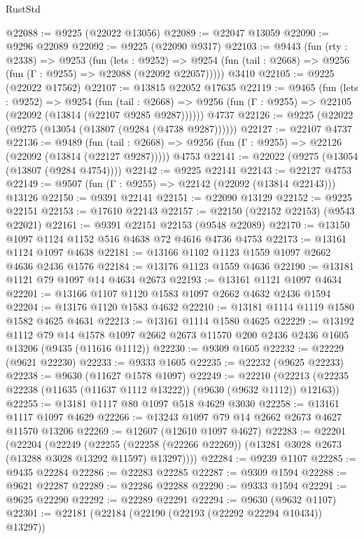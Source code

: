 \begin{lexlean}{RustStd}
\begin{coremodule}
@22088 := @9225 (@22022 @13056)
@22089 := @22047 @13059
@22090 := @9296 @22089
@22092 := @9225 (@22090 @9317)
@22103 := @9443
    (fun (rty : @2338) =>
    @9253
      (fun (lets : @9252) =>
      @9254 (fun (tail : @2668) => @9256 (fun (Γ : @9255) => @22088 (@22092 @22057)))))
    @3410
@22105 := @9225 (@22022 @17562)
@22107 := @13815 @22052 @17635
@22119 := @9465
    (fun (lets : @9252) =>
    @9254
      (fun (tail : @2668) =>
      @9256 (fun (Γ : @9255) => @22105 (@22092 (@13814 (@22107 @9285 @9287))))))
    @4737
@22126 := @9225 (@22022 (@9275 (@13054 (@13807 (@9284 (@4738 @9287))))))
@22127 := @22107 @4737
@22136 := @9489
    (fun (tail : @2668) => @9256 (fun (Γ : @9255) => @22126 (@22092 (@13814 (@22127 @9287)))))
    @4753
@22141 := @22022 (@9275 (@13054 (@13807 (@9284 @4754))))
@22142 := @9225 @22141
@22143 := @22127 @4753
@22149 := @9507 (fun (Γ : @9255) => @22142 (@22092 (@13814 @22143))) @13126
@22150 := @9391 @22141
@22151 := @22090 @13129
@22152 := @9225 @22151
@22153 := @17610 @22143
@22157 := @22150 (@22152 @22153) (@9543 @22021)
@22161 := @9391 @22151 @22153 (@9548 @22089)
@22170 := @13150 @1097 @1124 @1152 @516 @4638 @72 @4616 @4736 @4753
@22173 := @13161 @1124 @1097 @4638
@22181 := @13166 @1102 @1123 @1559 @1097 @2662 @4636 @2436 @1576
@22184 := @13176 @1123 @1559 @4636
@22190 := @13181 @1121 @79 @1097 @14 @4634 @2673
@22193 := @13161 @1121 @1097 @4634
@22201 := @13166 @1107 @1120 @1583 @1097 @2662 @4632 @2436 @1594
@22204 := @13176 @1120 @1583 @4632
@22210 := @13181 @1114 @1119 @1580 @1582 @4625 @4631
@22213 := @13161 @1114 @1580 @4625
@22229 := @13192
    @1112
    @79
    @14
    @1578
    @1097
    @2662
    @2673
    @11570
    @200
    @2436
    @2436
    @1605
    @13206
    (@9435 (@11616 @1112))
@22230 := @9309 @1605
@22232 := @22229 (@9621 @22230)
@22233 := @9333 @1605
@22235 := @22232 (@9625 @22233)
@22238 := @9630 (@11627 @1578 @1097)
@22249 := @22210
    (@22213 (@22235 @22238 (@11635 (@11637 @1112 @13222)) (@9630 (@9632 @1112)) @12163))
@22255 := @13181 @1117 @80 @1097 @518 @4629 @3030
@22258 := @13161 @1117 @1097 @4629
@22266 := @13243 @1097 @79 @14 @2662 @2673 @4627 @11570 @13206
@22269 := @12607 (@12610 @1097 @4627)
@22283 := @22201
    (@22204
      (@22249
        (@22255 (@22258 (@22266 @22269)) (@13281 @3028 @2673 (@13288 @3028 @13292 @11597) @13297))))
@22284 := @9239 @1107
@22285 := @9435 @22284
@22286 := @22283 @22285
@22287 := @9309 @1594
@22288 := @9621 @22287
@22289 := @22286 @22288
@22290 := @9333 @1594
@22291 := @9625 @22290
@22292 := @22289 @22291
@22294 := @9630 (@9632 @1107)
@22301 := @22181 (@22184 (@22190 (@22193 (@22292 @22294 @10434)) @13297))

\end{coremodule}
\end{lexlean}
